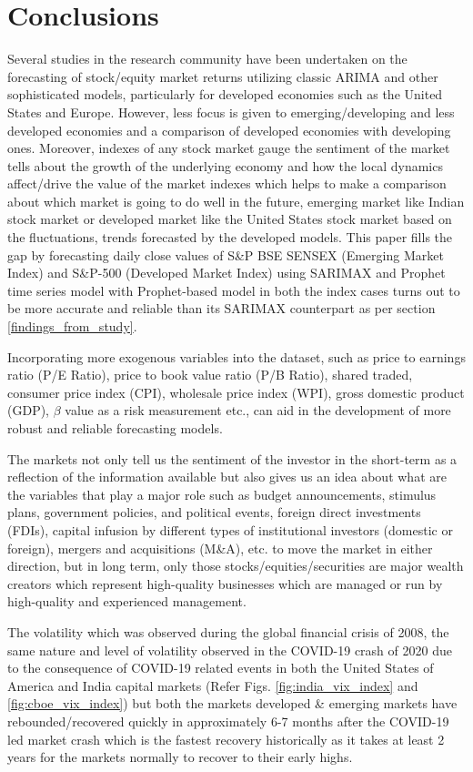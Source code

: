 \documentclass[conference]{IEEEtran}
\begin{document}
\section{Conclusions} \label{conclusions}
Several studies in the research community have been undertaken on the forecasting of stock/equity market returns utilizing classic ARIMA and other sophisticated models, particularly for developed economies such as the United States and Europe. However, less focus is given to emerging/developing and less developed economies and a comparison of developed economies with developing ones. Moreover, indexes of any stock market gauge the sentiment of the market tells about the growth of the underlying economy and how the local dynamics affect/drive the value of the market indexes \cite{b5} which helps to make a comparison about which market is going to do well in the future, emerging market like Indian stock market or developed market like the United States stock market based on the fluctuations, trends forecasted by the developed models.
This paper fills the gap by forecasting daily close values of S\&P BSE SENSEX (Emerging Market Index) and S\&P-500 (Developed Market Index) using SARIMAX and Prophet time series model with Prophet-based model in both the index cases turns out to be more accurate and reliable than its SARIMAX counterpart as per section \ref{findings_from_study}.

Incorporating more exogenous variables into the dataset, such as price to earnings ratio (P/E Ratio), price to book value ratio (P/B Ratio), shared traded, consumer price index (CPI), wholesale price index (WPI), gross domestic product (GDP), $\beta$ value as a risk measurement \cite{b3} etc., can aid in the development of more robust and reliable forecasting models.

The markets not only tell us the sentiment of the investor in the short-term as a reflection of the information available but also gives us an idea about what are the variables that play a major role such as budget announcements, stimulus plans, government policies, and political events, foreign direct investments (FDIs), capital infusion by different types of institutional investors (domestic or foreign), mergers and acquisitions (M\&A), etc. \cite{b15} to move the market in either direction, but in long term, only those stocks/equities/securities are major wealth creators which represent high-quality businesses which are managed or run by high-quality and experienced management.

The volatility which was observed during the global financial crisis of 2008, the same nature and level of volatility observed in the COVID-19 crash of 2020 due to the consequence of COVID-19 related events in both the United States of America and India capital markets (Refer Figs. \ref{fig:india_vix_index} and \ref{fig:cboe_vix_index}) but both the markets developed \& emerging markets have rebounded/recovered quickly in approximately 6-7 months after the COVID-19 led market crash which is the fastest recovery historically as it takes at least 2 years for the markets normally to recover to their early highs.
\end{document}
